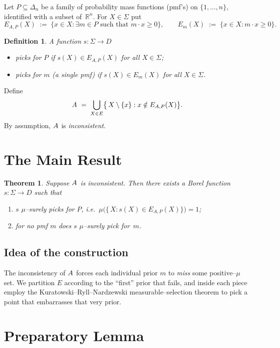 \documentclass[11pt]{article}
\newtheorem{theorem}{Theorem}
\newtheorem{definition}{Definition}
\newcommand{\R}{\mathbb{R}}
\begin{document}
Let $P\subseteq\Delta_{n}$ be a family of probability mass functions (pmf's) on $\{1,\dots,n\}$, identified with a subset of~$\R^{n}$.
For $X\in\Sigma$ put
\[
E_{A,P}(X)\;:=\;\bigl\{x\in X : \exists m\in P\text{ such that }m\cdot x\ge 0\bigr\},\qquad
E_{m}(X)\;:=\;\bigl\{x\in X : m\cdot x\ge 0\bigr\}.
\]

\begin{definition}
A function $s:\Sigma\to D$
\begin{itemize}
  \item \emph{picks for $P$} if $s(X)\in E_{A,P}(X)$ for all $X\in\Sigma$;
  \item \emph{picks for $m$} (a single pmf) if $s(X)\in E_{m}(X)$ for all $X\in\Sigma$.
\end{itemize}
\end{definition}

Define
\[
A^{\*}\;=\;\bigcup_{X\in E}\bigl\{\,X\setminus\{x\} : x\notin E_{A,P}(X)\bigr\}.
\]
By assumption, $A^{\*}$ is \emph{inconsistent}.

\section{The Main Result}

\begin{theorem}
\label{thm:selector}
Suppose $A^{\*}$ is inconsistent.
Then there exists a Borel function $s:\Sigma\to D$ such that
\begin{enumerate}[label=\textup{(\roman*)}]
  \item $s$ $\mu$--surely picks for $P$, i.e.\ $\mu\bigl(\{\,X : s(X)\in E_{A,P}(X)\}\bigr)=1$;
  \item for \emph{no} pmf $m$ does $s$ $\mu$--surely pick for~$m$.
\end{enumerate}
\end{theorem}

\subsection*{Idea of the construction}
The inconsistency of $A^{\*}$ forces each individual prior $m$ to \emph{miss} some positive--$\mu$ set.
We partition $E$ according to the ``first'' prior that fails,
and inside each piece employ the Kuratowski--Ryll--Nardzewski measurable--selection theorem to pick a point that embarrasses that very prior.

\section{Preparatory Lemma}
\end{document}
